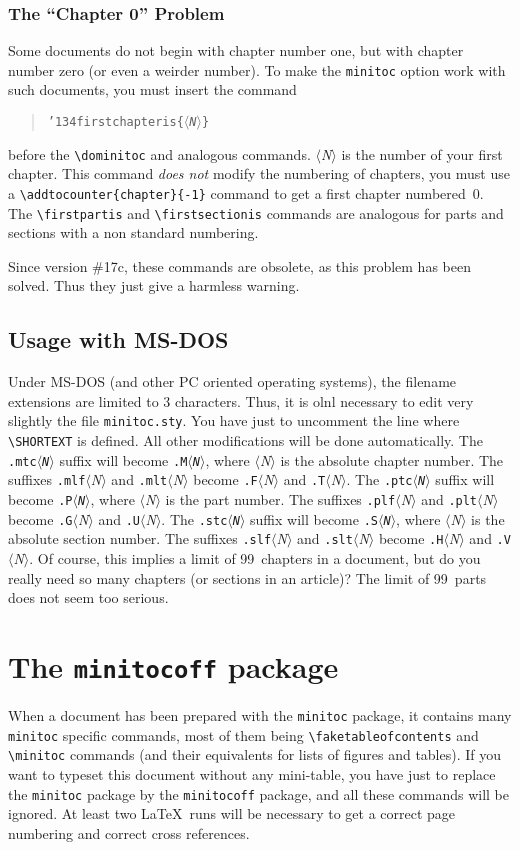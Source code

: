 \documentclass[12pt,a4paper]{book}
\makeatletter
\newcommand\virage{\marginpar[\raggedleft
 {{\manfnt\symbol{'177}}~~}]{\raggedright {~~\manfnt\symbol{'177}}}}
\def\@Vir{\hbox to12mm{\hbox{}\leaders%
 \hbox{{\manfnt\char127}\kern2pt}\hfil\hbox{}}}
\newcommand\Virage{\marginpar[\hfill{\@Vir~~}]{{~~\@Vir}\hfill}}
\def\Cat#1{\hbox{$\langle${\it #1\/}$\rangle$}}
\def\<#1>{\Cat{#1}}
\def\bs{{\tt\char'134}}
\makeatother
\begin{document}
\subsubsection{The ``Chapter 0'' Problem}
Some documents do not begin with chapter number one, but with chapter
number zero (or even a weirder number). To make the {\tt minitoc}
option work with such documents, you must insert the command
\begin{quote}
\tt\bs firstchapteris\{\<N>\}
\end{quote}
before the \verb|\dominitoc| and analogous commands. \<N> is the number
of your first chapter. This command {\em does not\/}
modify the numbering of chapters, you must use a
\verb|\addtocounter{chapter}{-1}| command to get a first chapter
numbered~0. The \verb|\firstpartis| and \verb|\firstsectionis|
commands are analogous for parts and sections with a non standard numbering.

Since\virage{} version \#17c, these commands are obsolete, as this
problem has been solved. Thus they just give a harmless warning.

\subsection{Usage with MS-DOS}\label{MS-DOS}
Under\Virage{} MS-DOS (and other PC oriented operating systems),
the filename extensions are
limited to 3 characters. Thus, it is olnl necessary to edit very
slightly the file {\tt minitoc.sty}. You have just to uncomment
the line where \verb|\SHORTEXT| is defined. All other modifications
will be done automatically.
The {\tt.mtc\<N>}
suffix will become {\tt.M\<N>}, where \<N> is the absolute chapter
number.
The suffixes \verb|.mlf|\<N> and \verb|.mlt|\<N> become
\verb|.F|\<N> and \verb|.T|\<N>.
The {\tt.ptc\<N>}
suffix will become {\tt.P\<N>}, where \<N> is the part
number.
The suffixes \verb|.plf|\<N> and \verb|.plt|\<N> become
\verb|.G|\<N> and \verb|.U|\<N>.
The {\tt.stc\<N>}
suffix will become {\tt.S\<N>}, where \<N> is the absolute section
number.
The suffixes \verb|.slf|\<N> and \verb|.slt|\<N> become
\verb|.H|\<N> and \verb|.V|\<N>.
Of course, this implies a limit of 99~chapters in a
document, but do you really need so many chapters (or sections in an
article)? The limit of 99~parts does not seem too serious.

\section{The {\tt minitocoff} package}\label{o+minitocoff}
When a document has been prepared with the {\tt minitoc} package,
it contains many {\tt minitoc} specific commands, most of them being
\verb|\faketableofcontents| and \verb|\minitoc| commands (and their
equivalents for lists of figures and tables).
If you want to typeset
this document without any mini-table, you have just to replace the
{\tt minitoc} package by the {\tt minitocoff} package, and all these
commands will be ignored. At least two \LaTeX\ runs will be necessary
to get a correct page numbering and correct cross references.
\end{document}
